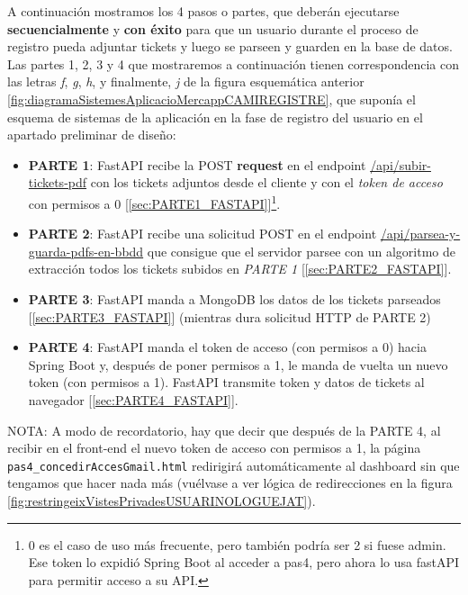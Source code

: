 \documentclass[a4paper,12pt]{report}
\begin{document}
	A continuación mostramos los 4 pasos o partes, que deberán ejecutarse \textbf{secuencialmente} y \textbf{con éxito} para que un usuario durante el proceso de registro pueda adjuntar tickets y luego se parseen y guarden en la base de datos. Las partes 1, 2, 3 y 4 que mostraremos a continuación tienen correspondencia con las letras \textit{f}, \textit{g}, \textit{h}, y finalmente, \textit{j} de la figura esquemática anterior \ref{fig:diagramaSistemesAplicacioMercappCAMIREGISTRE}, que suponía el esquema de sistemas de la aplicación en la fase de registro del usuario en el apartado preliminar de diseño:
	
	\begin{itemize}
	\setlength{\itemsep}{-.3em}
		\item \textbf{PARTE 1}: FastAPI recibe la POST \textbf{request} en el endpoint \href{https://github.com/blackcub3s/mercApp/blob/1394c4a58c59d41e1b64f1113007277676fe4cf8/APP%20WEB/__FastAPI__/app/controlador.py#L37}{/api/subir-tickets-pdf} con los tickets adjuntos desde el cliente y con el \textit{token de acceso} con permisos a 0 [\ref{sec:PARTE1_FASTAPI}]\footnote{0 es el caso de uso más frecuente, pero también podría ser 2 si fuese admin. Ese token lo expidió Spring Boot al acceder a pas4, pero ahora lo usa fastAPI para permitir acceso a su API.}.
		\item \textbf{PARTE 2}: FastAPI recibe una solicitud POST en el endpoint \href{https://github.com/blackcub3s/mercApp/blob/8f9e4de79e8f384a9da6e0c43222135d5d8e3bd2/APP%20WEB/__FastAPI__/app/controlador.py#L116}{/api/parsea-y-guarda-pdfs-en-bbdd} que consigue que el servidor parsee con un algoritmo de extracción todos los tickets subidos en \textit{PARTE 1} [\ref{sec:PARTE2_FASTAPI}].
		\item \textbf{PARTE 3}: FastAPI manda a MongoDB los datos de los tickets parseados [\ref{sec:PARTE3_FASTAPI}] (mientras dura solicitud HTTP de PARTE 2)
		\item \textbf{PARTE 4}: FastAPI manda el token de acceso (con permisos a 0) hacia Spring Boot y, después de poner permisos a 1, le manda de vuelta un nuevo token (con permisos a 1). FastAPI transmite token y datos de tickets al navegador [\ref{sec:PARTE4_FASTAPI}].
	\end{itemize}

	
	NOTA: A modo de recordatorio, hay que decir que después de la PARTE 4, al recibir en el front-end el nuevo token de acceso con permisos a 1, la página \texttt{pas4\_concedirAccesGmail.html} redirigirá automáticamente al dashboard sin que tengamos que hacer nada más (vuélvase a ver lógica de redirecciones en la figura \ref{fig:restringeixVistesPrivadesUSUARINOLOGUEJAT}).
	
\end{document}
